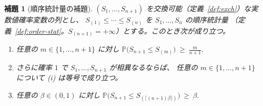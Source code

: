 \documentclass[a4paper,11pt]{jsarticle}
\theoremstyle{definition}
\theoremstyle{plain}
\newtheorem{lemma}[definition]{補題}
\theoremstyle{remark}
\newcommand{\Prob}{\mathbb{P}}
\begin{document}
\begin{lemma}[順序統計量の補題]
  \label{lem:quantile}
  $(S_1,\dots,S_{n+1})$ を交換可能（定義~\ref{def:exch}）な実数値確率変数の列とし、
  $S_{(1)}\le\cdots\le S_{(n)}$ を $S_1,\dots,S_n$ の順序統計量
  （定義~\ref{def:order-stat}。$S_{(n+1)}=+\infty$）とする。このとき次が成り立つ。
  \begin{enumerate}
    \item[(i)] 任意の $m\in\{1,\dots,n+1\}$ に対し
      $\displaystyle \Prob\bigl(S_{n+1}\le S_{(m)}\bigr)\ \ge\ \frac{m}{n+1}$.
    \item[(ii)] さらに確率 $1$ で $S_1,\dots,S_{n+1}$ が相異なるならば、
      任意の $m\in\{1,\dots,n+1\}$ について (i) は等号で成り立つ。
    \item[(iii)] 任意の $\beta\in(0,1)$ に対し
      $\displaystyle \Prob\bigl(S_{n+1}\le S_{(\lceil(n+1)\beta\rceil)}\bigr)\ \ge\ \beta$.
  \end{enumerate}
\end{lemma}
\end{document}
